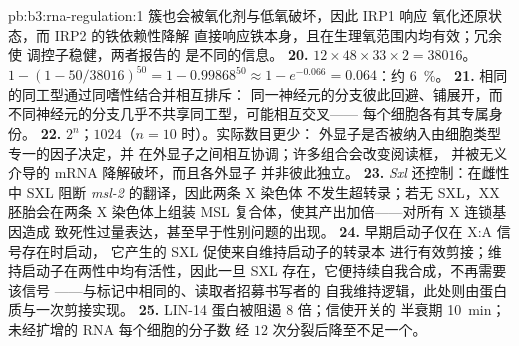\begin{solution}{pb:b3:rna-regulation:1}
簇也会被氧化剂与低氧破坏，因此 IRP1 响应
氧化还原状态，而 IRP2 的铁依赖性降解
直接响应铁本身，且在生理氧范围内均有效；冗余使
调控子稳健，两者报告的
是不同的信息。
\textbf{20.} $12\times 48\times 33\times 2 = \num{38016}$。$1 - (1 -
50/\num{38016})^{50} = 1 - 0.99868^{50} \approx 1 - e^{-0.066} =
0.064$：约 \qty{6}{\%}。
\textbf{21.} 相同的同工型通过同嗜性结合并相互排斥：
同一神经元的分支彼此回避、铺展开，而
不同神经元的分支几乎不共享同工型，可能相互交叉——
每个细胞各有其专属身份。
\textbf{22.} $2^{n}$；$\num{1024}$（$n = 10$ 时）。实际数目更少：
外显子是否被纳入由细胞类型专一的因子决定，并
在外显子之间相互协调；许多组合会改变阅读框，
并被无义介导的 mRNA 降解破坏，而且各外显子
并非彼此独立。
\textbf{23.} \emph{Sxl} 还控制：在雌性中
SXL 阻断 \emph{msl-2} 的翻译，因此两条 X 染色体
不发生超转录；若无 SXL，XX 胚胎会在两条 X 染色体上组装
MSL 复合体，使其产出加倍——对所有 X 连锁基因造成
致死性过量表达，甚至早于性别问题的出现。
\textbf{24.} 早期启动子仅在 X:A 信号存在时启动，
它产生的 SXL 促使来自维持启动子的转录本
进行有效剪接；维持启动子在两性中均有活性，因此一旦
SXL 存在，它便持续自我合成，不再需要该信号
——与标记中相同的、读取者招募书写者的
自我维持逻辑，此处则由蛋白质与一次剪接实现。
\textbf{25.} LIN-14 蛋白被阻遏 $8$ 倍；信使开关的
半衰期 \qty{10}{min}；未经扩增的 RNA 每个细胞的分子数
经 $12$ 次分裂后降至不足一个。
\end{solution}
